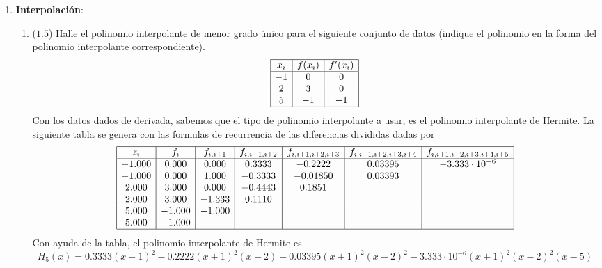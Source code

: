 \documentclass[12pt]{article}
\begin{document}
\begin{enumerate}[leftmargin=*,widest=9]
\begin{enumerate}[label=\alph*]
    \end{enumerate}
    \item \textbf{Interpolación}:
    \begin{enumerate}[label=\alph*]
    \item ($1.5$) Halle el polinomio interpolante de menor grado único para el siguiente conjunto de datos (indique el polinomio en la forma del polinomio interpolante correspondiente).
    \[
    \begin{array}{|c|c|c|}
    \hline
    x_i & f(x_i) & f^\prime(x_i)\\
    \hline
    -1 & 0 & 0 \\
    2 & 3 & 0\\
    5 & -1 & -1\\
    \hline
    \end{array}
    \]
    Con los datos dados de derivada, sabemos que el tipo de polinomio interpolante a usar, es el polinomio interpolante de Hermite. La siguiente tabla se genera con las formulas de recurrencia de las diferencias divididas dadas por
    \[
    \begin{array}{|c|c|c|c|c|c|c|}
    \hline
    z_i & f_i & f_{i, i + 1} & f_{i, i+1, i+2} & f_{i, i+1, i+2, i+3} & f_{i, i+1, i+2, i+3, i+4} & f_{i, i+1, i+2, i+3, i+4, i+5}\\
    \hline
    -1.000 & 0.000 & 0.000 & 0.3333 & -0.2222 & 0.03395 & -3.333\cdot 10^{-6} \\
    -1.000 & 0.000 & 1.000 & -0.3333 & -0.01850 & 0.03393 & \\
    2.000 & 3.000 & 0.000  & -0.4443 & 0.1851 && \\
    2.000 & 3.000 & -1.333  & 0.1110 &&& \\
    5.000 & -1.000 & -1.000 &&&& \\
    5.000 & -1.000 &&&&& \\
    \hline
    \end{array}
    \]
    Con ayuda de la tabla, el polinomio interpolante de Hermite es
    \[
    H_5(x) = 0.3333{(x+1)}^2 - 0.2222{(x+1)}^2(x-2) + 0.03395(x+1)^2(x-2)^2 - 3.333\cdot 10^{-6}(x+1)^2(x-2)^2(x-5)
\]
\end{enumerate}
\end{enumerate}
\end{document}
